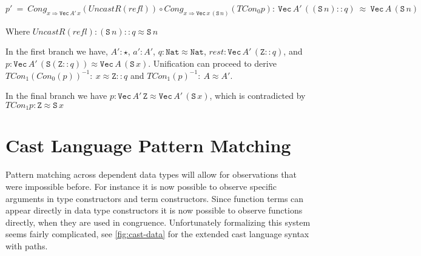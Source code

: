 $p'\ =\ Cong_{x\Rightarrow \mathtt{Vec}\,A'\,x}\left(UncastR\left(refl\right)\right)\circ Cong_{x\Rightarrow \mathtt{Vec}\,x\,\left(\mathtt{S}\,n\right)}\left(TCon_{0}p\right):\ \mathtt{Vec}\,A'\,\left(\left(\mathtt{S}\,n\right)::q\right)\ \approx\ \mathtt{Vec}\,A\,\left(\mathtt{S}\,n\right)$

Where 
$UncastR\left(refl\right): \left(\mathtt{S}\,n\right)::q  \approx \mathtt{S}\,n $

In the first branch we have, 
  $A':\star$, $a':A'$,
  $q:\mathtt{Nat}\approx \mathtt{Nat}$,
  $rest:\mathtt{Vec}\,A'\,\left(\mathtt{Z}::q\right)$, 
  and $p:\mathtt{Vec}\,A'\,\left(\mathtt{S}\left(\mathtt{Z}::q\right)\right)\approx \mathtt{Vec}\,A\,\left(\mathtt{S}\,x\right)$.
Unification can proceed to derive $TCon_{1}\left(Con_{0}\left(p\right)\right)^{-1}:\ x\approx \mathtt{Z}::q$
and $TCon_{1}\left(p\right)^{-1}:\ A\approx A'$.

In the final branch we have $p:\mathtt{Vec}\,A'\,\mathtt{Z}\approx \mathtt{Vec}\,A'\,\left(\mathtt{S}\,x\right)$,
which is contradicted by $TCon_{1}p:\mathtt{Z}\approx \mathtt{S}\,x$


\section{Cast Language Pattern Matching}


Pattern matching across dependent data types will allow for observations that were impossible before.
For instance it is now possible to observe specific arguments in type constructors and term constructors.
Since function terms can appear directly in data type constructors it is now possible to observe functions directly, when they are used in congruence.
Unfortunately formalizing this system seems fairly complicated, see \ref{fig:cast-data} for the extended cast language syntax with paths. 

